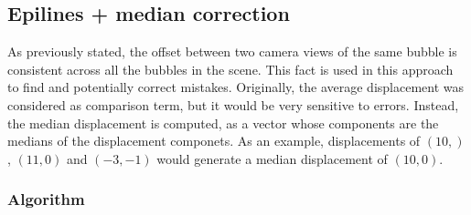 \subsection{Epilines + median correction}
\label{sec:match:epi-median}

As previously stated, the offset between two camera views of the same bubble is consistent across all the bubbles in the scene.
This fact is used in this approach to find and potentially correct mistakes.
Originally, the average displacement was considered as comparison term, but it would be very sensitive to errors.
Instead, the median displacement is computed, as a vector whose components are the medians of the displacement componets.
As an example, displacements of $(10,)$, $(11,0)$ and $(-3, -1)$ would generate a median displacement of $(10, 0)$.

\subsubsection{Algorithm}


